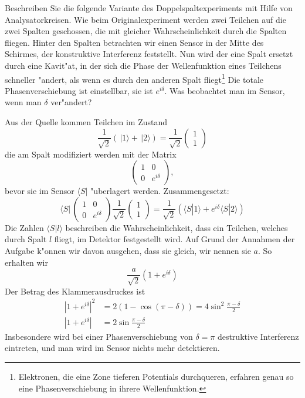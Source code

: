 Beschreiben Sie die folgende Variante des Doppelspaltexperiments mit Hilfe 
von Analysatorkreisen.
Wie beim Originalexperiment werden zwei Teilchen auf die zwei Spalten
geschossen, die mit gleicher Wahrscheinlichkeit durch die Spalten fliegen.
Hinter den Spalten betrachten wir einen Sensor in der Mitte des Schirmes,
der konstruktive Interferenz feststellt.
Nun wird der eine Spalt ersetzt durch eine Kavit"at, in der sich die Phase
der Wellenfunktion eines Teilchens schneller "andert, als wenn es durch
den anderen Spalt fliegt\footnote{Elektronen, die eine Zone tieferen
Potentials durchqueren, erfahren genau so eine Phasenverschiebung in
ihrere Wellenfunktion.}
Die totale Phasenverschiebung ist einstellbar, sie ist $e^{i\delta}$.
Was beobachtet man im Sensor, wenn man $\delta$ ver"andert?

\begin{loesung}
Aus der Quelle kommen Teilchen im Zustand
\[
\frac1{\sqrt{2}}(\,|1\rangle+\,|2\rangle)
=
\frac1{\sqrt{2}}
\begin{pmatrix}
1\\1
\end{pmatrix}
\]
die am Spalt modifiziert werden mit der Matrix
\[
\begin{pmatrix}
1&0\\
0&e^{i\delta}
\end{pmatrix},
\]
bevor sie im Sensor $\langle S|$ "uberlagert werden.
Zusammengesetzt:
\[
\langle S|\,
\begin{pmatrix}
1&0\\
0&e^{i\delta}
\end{pmatrix}
\frac1{\sqrt{2}}
\begin{pmatrix}
1\\1
\end{pmatrix}
=
\frac1{\sqrt{2}}(
\langle S|1\rangle + e^{i\delta}\langle S|2\rangle
)
\]
Die Zahlen
$\langle S|l\rangle$
beschreiben die Wahrscheinlichkeit, dass ein Teilchen, welches durch
Spalt $l$ fliegt, im Detektor festgestellt wird.
Auf Grund der Annahmen der Aufgabe k"onnen wir davon ausgehen, dass
sie gleich, wir nennen sie $a$. So erhalten wir
\[
\frac{a}{\sqrt{2}}(1+e^{i\delta})
\]
Der Betrag des Klammerausdruckes ist
\begin{align*}
|1+e^{i\delta}|^2
&=2(1-\cos(\pi-\delta))
=4\sin^2\frac{\pi-\delta}2
\\
|1+e^{i\delta}|
&=
2\sin\frac{\pi-\delta}2
\end{align*}
Insbesondere wird bei einer Phasenverschiebung von $\delta=\pi$ 
destruktive Interferenz eintreten, und man wird im Sensor nichts
mehr detektieren.
\end{loesung}

